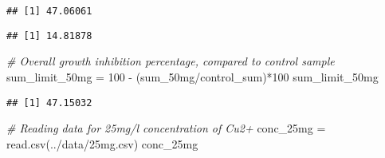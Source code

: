 \documentclass[
]{article}
\newenvironment{Shaded}{\begin{snugshade}}{\end{snugshade}}
\newcommand{\CommentTok}[1]{\textcolor[rgb]{0.56,0.35,0.01}{\textit{#1}}}
\newcommand{\DecValTok}[1]{\textcolor[rgb]{0.00,0.00,0.81}{#1}}
\newcommand{\FunctionTok}[1]{\textcolor[rgb]{0.00,0.00,0.00}{#1}}
\newcommand{\NormalTok}[1]{#1}
\newcommand{\OtherTok}[1]{\textcolor[rgb]{0.56,0.35,0.01}{#1}}
\newcommand{\SpecialCharTok}[1]{\textcolor[rgb]{0.00,0.00,0.00}{#1}}
\newcommand{\StringTok}[1]{\textcolor[rgb]{0.31,0.60,0.02}{#1}}
\begin{document}
\begin{Shaded}
\end{Shaded}

\begin{verbatim}
## [1] 47.06061
\end{verbatim}

\begin{Shaded}
\end{Shaded}

\begin{verbatim}
## [1] 14.81878
\end{verbatim}

\begin{Shaded}
\begin{Highlighting}[]
\CommentTok{\# Overall growth inhibition percentage, compared to control sample}
\NormalTok{sum\_limit\_50mg }\OtherTok{=} \DecValTok{100} \SpecialCharTok{{-}}\NormalTok{ (sum\_50mg}\SpecialCharTok{/}\NormalTok{control\_sum)}\SpecialCharTok{*}\DecValTok{100}
\NormalTok{sum\_limit\_50mg}
\end{Highlighting}
\end{Shaded}

\begin{verbatim}
## [1] 47.15032
\end{verbatim}

\begin{Shaded}
\begin{Highlighting}[]
\CommentTok{\# Reading data for 25mg/l concentration of Cu2+}
\NormalTok{conc\_25mg }\OtherTok{=} \FunctionTok{read.csv}\NormalTok{(}\StringTok{\textquotesingle{}../data/25mg.csv\textquotesingle{}}\NormalTok{)}
\NormalTok{conc\_25mg}
\end{Highlighting}
\end{Shaded}
\end{document}
